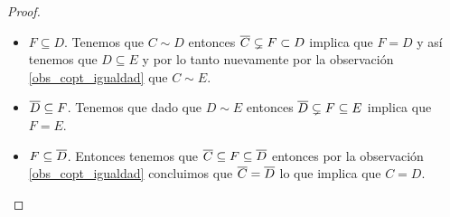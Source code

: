 \documentclass[tesis.tex]{subfiles}
\begin{document}
\begin{proof}
\begin{itemize}
\begin{itemize}
			\item $F \subseteq D$.
			Tenemos que $C \sim D$ entonces $\overline C \subsetneq F \subset D$ implica que $F = D$ y así tenemos que $D \subseteq E$ y por lo tanto nuevamente por la observación \ref{obs_copt_igualdad} que $C \sim E$.
			
			\item $\overline D \subseteq F$. 
			Tenemos que dado que $D \sim E$ entonces $\overline D \subsetneq F \subseteq E$ implica que $F = E$.
			
			\item $F \subseteq \overline D$.
			Entonces tenemos que $\overline C \subseteq F \subseteq \overline D$ entonces por la observación \ref{obs_copt_igualdad} concluimos que $\overline C = \overline D$ lo que implica que $C = D$.
		\end{itemize}
	\end{itemize}
\end{proof}
\end{document}
